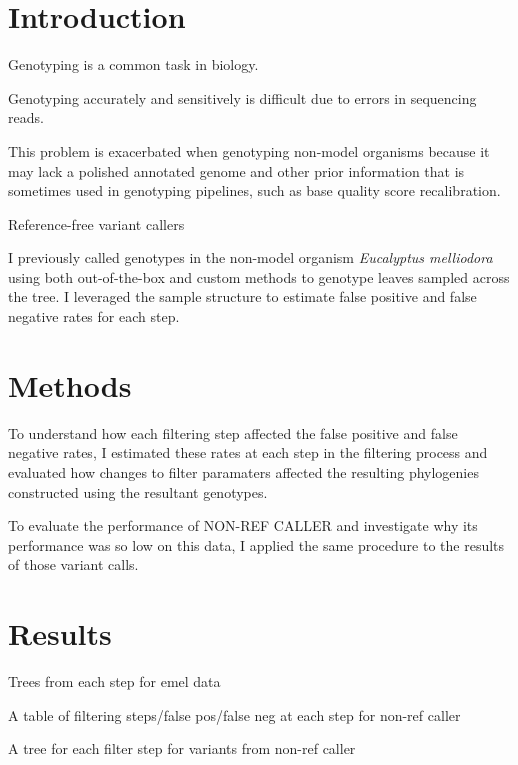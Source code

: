 \documentclass{article}
\begin{document}
\linenumbers

\section{Introduction}
\begin{outline}
	\item Genotyping is a common task in biology.
	\begin{outline}
		\item Genotyping accurately and sensitively is difficult due to errors in sequencing reads.
		\item This problem is exacerbated when genotyping non-model organisms because it may lack a polished annotated genome and other prior information that is sometimes used in genotyping pipelines, such as base quality score recalibration.
	\end{outline}
	\item Reference-free variant callers
	\begin{outline}
	\end{outline}
	\item I previously called genotypes in the non-model organism \textit{Eucalyptus melliodora} using both out-of-the-box and custom methods to genotype leaves sampled across the tree. I leveraged the sample structure to estimate false positive and false negative rates for each step.

\end{outline}

\section{Methods}
\begin{outline}
	\item To understand how each filtering step affected the false positive and false negative rates, I estimated these rates at each step in the filtering process and evaluated how changes to filter paramaters affected the resulting phylogenies constructed using the resultant genotypes.
	\item To evaluate the performance of NON-REF CALLER and investigate why its performance was so low on this data, I applied the same procedure to the results of those variant calls.
\end{outline}

\section{Results}
\begin{outline}
	\item Trees from each step for emel data
	\item A table of filtering steps/false pos/false neg at each step for non-ref caller
	\item A tree for each filter step for variants from non-ref caller
\end{outline}
\end{document}
